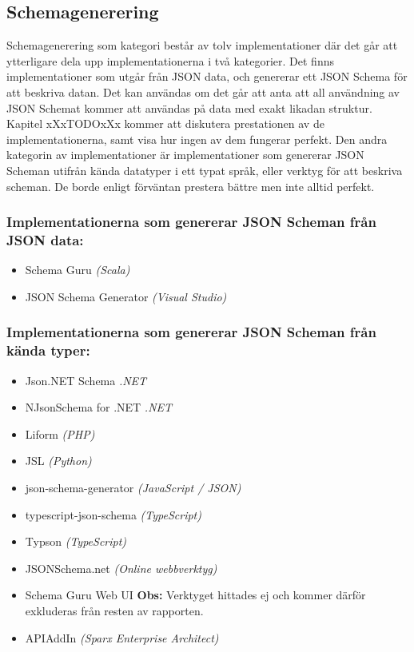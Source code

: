 \subsection{Schemagenerering}
\label{sec:teori:schema-användningsområden:generering}
Schemagenerering som kategori består av tolv implementationer där det går att ytterligare dela upp implementationerna i två kategorier. Det finns implementationer som utgår från JSON data, och genererar ett JSON Schema för att beskriva datan. Det kan användas om det går att anta att all användning av JSON Schemat kommer att användas på data med exakt likadan struktur. Kapitel xXxTODOxXx kommer att diskutera prestationen av de implementationerna, samt visa hur ingen av dem fungerar perfekt. Den andra kategorin av implementationer är implementationer som genererar JSON Scheman utifrån kända datatyper i ett typat språk, eller verktyg för att beskriva scheman. De borde enligt förväntan prestera bättre men inte alltid perfekt. \cite{TheJSONSchemaorganisation}

\subsubsection{Implementationerna som genererar JSON Scheman från JSON data:}
\begin{itemize}
	\item Schema Guru \textit{(Scala)} \cite{Snowplow}
	\item JSON Schema Generator \textit{(Visual Studio)} \cite{MadsKristensen}
\end{itemize}

\subsubsection{Implementationerna som genererar JSON Scheman från kända typer:}
\begin{itemize}
	\item Json.NET Schema \textit{.NET} \cite{Newtonsoft}
	\item NJsonSchema for .NET \textit{.NET} \cite{Suter}
	\item Liform \textit{(PHP)} \cite{Limenius}
	\item JSL \textit{(Python)} \cite{Romanovich}
	\item json-schema-generator \textit{(JavaScript / JSON)} \cite{Romanovich}
	\item typescript-json-schema \textit{(TypeScript)} \cite{El-Dardiry}
	\item Typson \textit{(TypeScript)} \cite{Bovet}
	\item JSONSchema.net \textit{(Online webbverktyg)} \cite{Bovet}
	\item Schema Guru Web UI \textbf{Obs:} Verktyget hittades ej och kommer därför exkluderas från resten av rapporten.
	\item APIAddIn \textit{(Sparx Enterprise Architect)} \cite{Tomlinson}
\end{itemize}

